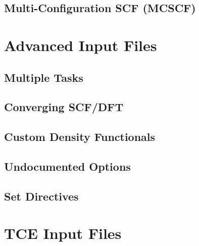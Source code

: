 \documentclass[letterpaper,12pt]{article}
\begin{document}
\subsection{Multi-Configuration SCF (MCSCF)}\label{sec:MultiConfigurationSCF}



\section{Advanced Input Files}\label{sec:AdvancedInputFiles}


\subsection{Multiple Tasks}\label{sec:MultipleTasks}


\subsection{Converging SCF/DFT}\label{sec:ConvergingSCF}


\subsection{Custom Density Functionals}\label{sec:CustomDensityFunctionals}


\subsection{Undocumented Options}\label{sec:UndocumentedOptions}


\subsection{Set Directives}\label{sec:SetDirectives}

\section{TCE Input Files}\label{sec:TCEInputFiles}
\end{document}
